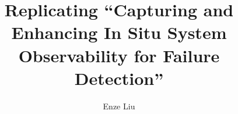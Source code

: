 \documentclass[sigconf,anonymous=false]{acmart}
\begin{document}
\title{Replicating ``Capturing and Enhancing In Situ System Observability
for Failure Detection''}
\author{Enze Liu}

\maketitle


\clearpage


\end{document}
